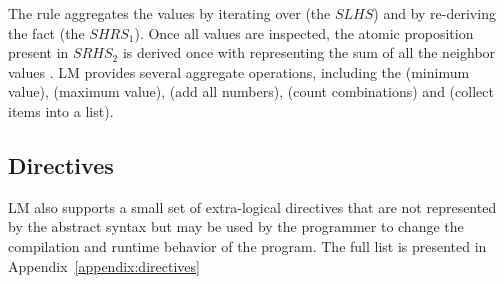 The rule aggregates the values  by iterating over
 (the $SLHS$) and by re-deriving the
fact  (the $SHRS_1$). Once all
values are inspected, the atomic proposition  present in
$SRHS_2$ is derived once with  representing the sum of all the
neighbor values . LM provides several aggregate operations, including the
 (minimum value),  (maximum value),  (add all
numbers),  (count combinations) and  (collect items
into a list).

\subsection{Directives}

LM also supports a small set of extra-logical directives that are not
represented by the abstract syntax but may be used by the programmer to change
the compilation and runtime behavior of the program. The full list is presented
in Appendix~\ref{appendix:directives}
